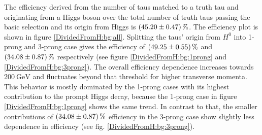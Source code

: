 %
%
%
The efficiency derived from the number of taus matched to a truth tau and originating from a Higgs boson over the total number of truth taus passing the basic selection and its origin from Higgs is $\SI{45.20\pm 0.47}{\percent}$. The efficiency plot is shown in figure \ref{DividedFromH:bg:all}. Splitting the taus' origin from $H^0$ into 1-prong and 3-prong case gives the efficiency of $\SI{49.25\pm 0.55}{\percent}$ and $\SI{34.08\pm 0.87}{\percent}$ respectively (see figure \ref{DividedFromH:bg:1prong} and \ref{DividedFromH:bg:3prong}). %
The overall efficiency dependence increases towards $\SI{200}{\giga\electronvolt}$ and fluctuates beyond that threshold for higher transverse momenta. This behavior is mostly dominated by the 1-prong cases with its highest contribution to the prompt Higgs decay, because the 1-prong case in figure \ref{DividedFromH:bg:1prong} shows the same trend. In contrast to that, the smaller contributions of $\SI{34.08\pm 0.87}{\percent}$ efficiency in the 3-prong case show slightly less dependence in efficiency (see fig. \ref{DividedFromH:bg:3prong}).\par
%
